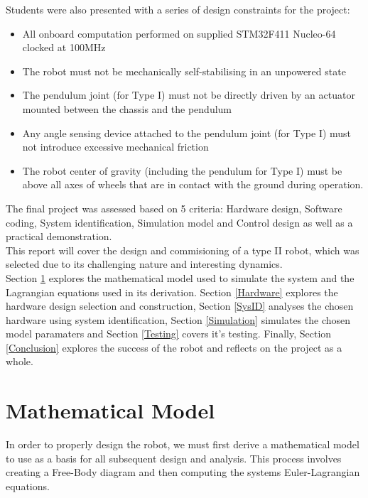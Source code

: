 \documentclass{UoNMCHA}
\numberwithin{equation}{section}
\begin{document}
\newpage
Students were also presented with a series of design constraints for the project:

\begin{itemize}
    \item All onboard computation performed on supplied STM32F411 Nucleo-64 clocked at 100MHz
    \item The robot must not be mechanically self-stabilising in an unpowered state
    \item The pendulum joint (for Type I) must not be directly driven by an actuator mounted between
    the chassis and the pendulum
    \item Any angle sensing device attached to the pendulum joint (for Type I) must not introduce excessive mechanical friction
    \item The robot center of gravity (including the pendulum for Type I) must be above all axes of wheels that are in contact with the ground during operation.

\end{itemize}

The final project was assessed based on 5 criteria: Hardware design, Software coding, System identification, Simulation model and Control design as well as a practical demonstration. \\

 This report will cover the design and commisioning of a type II robot, which was selected due to its challenging nature and interesting dynamics. \\ 
 Section \ref{Math} explores the mathematical model used to simulate the system and the Lagrangian equations used in its derivation. Section \ref{Hardware} explores the hardware design selection and construction, Section \ref{SysID} analyses the chosen hardware using system identification, Section \ref{Simulation} simulates the chosen model paramaters and Section \ref{Testing} covers it's testing. Finally, Section \ref{Conclusion} explores the success of the robot and reflects on the project as a whole.


\newpage
\section{Mathematical Model}\label{Math}

In order to properly design the robot, we must first derive a mathematical model to use as a basis for all subsequent design and analysis. This process involves creating a Free-Body diagram and then computing the systems Euler-Lagrangian equations.
\end{document}
